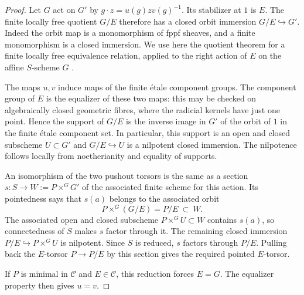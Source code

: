 \begin{proof}
Let $G$ act on $G'$ by
$g\cdot z=u(g)zv(g)^{-1}$.  Its stabilizer at $1$ is $E$.  The finite
locally free quotient $G/E$ therefore has a closed orbit immersion
$G/E\hookrightarrow G'$.  Indeed the orbit map is a monomorphism of fppf
sheaves, and a finite monomorphism is a closed immersion.  We use here
the quotient theorem for a finite locally free equivalence relation,
applied to the right action of $E$ on the affine $S$-scheme $G$
\cite[Expos\'e~V, Theorem~4.1(iv)]{C_SGA3I}.

The maps $u,v$ induce maps of the finite \'etale component groups.
The component group of $E$ is the equalizer of these two maps: this may
be checked on algebraically closed geometric fibres, where the radicial
kernels have just one point.  Hence the support of $G/E$ is the inverse
image in $G'$ of the orbit of $1$ in the finite \'etale component set.
In particular, this support is an open and closed subscheme $U\subset G'$
and $G/E\hookrightarrow U$ is a nilpotent closed immersion.  The
nilpotence follows locally from noetherianity and equality of supports.

An isomorphism of the two pushout torsors is the same as a section
$s\colon S\to W:=P\mathbin{\times^G}G'$ of the associated finite scheme
for this action.  Its pointedness says that $s(a)$ belongs to the
associated orbit
\[
P\mathbin{\times^G}(G/E)=P/E\ \subset\ W.
\]
The associated open and closed subscheme
$P\mathbin{\times^G}U\subset W$ contains $s(a)$, so connectedness of
$S$ makes $s$ factor through it.  The remaining closed immersion
$P/E\hookrightarrow P\mathbin{\times^G}U$ is nilpotent.  Since $S$ is
reduced, $s$ factors through $P/E$.  Pulling back the $E$-torsor
$P\to P/E$ by this section gives the required pointed $E$-torsor.

If $P$ is minimal in $\mathcal C$ and $E\in\mathcal C$, this reduction
forces $E=G$.  The equalizer property then gives $u=v$.
\end{proof}

